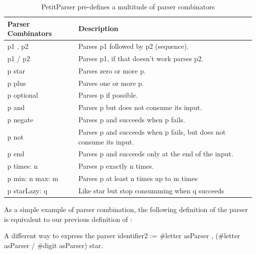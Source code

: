 \documentclass[a4paper,10pt,twoside]{book}
\begin{document}
\begin{table}
  \centering
  \begin{tabular}{lp{}}
    \textbf{Parser Combinators} & \textbf{Description}                                                \\
    \midrule
    p1 , p2                     & Parses p1 followed by p2 (sequence).                                \\
    p1 / p2                     & Parses p1, if that doesn't work parses p2.                          \\
    p star                      & Parses zero or more p.                                              \\
    p plus                      & Parses one or more p.                                               \\
    p optional                  & Parses p if possible.                                               \\
    p and                       & Parses p but does not consume its input.                            \\
    p negate                    & Parses p and succeeds when p fails.                                 \\
    p not                       & Parses p and succeeds when p fails, but does not consume its input. \\
    p end                       & Parses p and succeeds only at the end of the input.                 \\
    p times: n                  & Parses p exactly n times.                                           \\
    p min: n max: m             & Parses p at least n times up to m times                             \\
    p starLazy: q               & Like star but stop consumming when q succeeds                       \\

  \end{tabular}
  \caption{PetitParser pre-defines a multitude of parser combinators}
  \label{tab:parser-combinators}
\end{table}

As a simple example of parser combination, the following definition of
the  parser is equivalent to our previous definition
of :

\begin{script}[identifier2]{A different way to express the  parser}
identifier2 := #letter asParser , (#letter asParser / #digit asParser) star.
\end{script}
\end{document}
